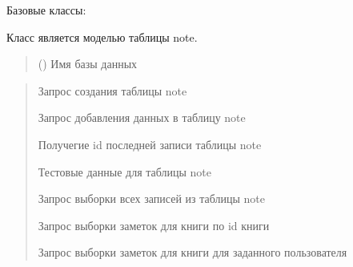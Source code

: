 \documentclass[letterpaper,10pt,russian]{sphinxmanual}
\begin{document}
\begin{fulllineitems}
\label{\detokenize{database.sqlite3_interface.tables:database.sqlite3_interface.tables.note.Note}}
\pysigstartsignatures
{}
\pysigstopsignatures
\sphinxAtStartPar
Базовые классы: {\hyperref[\detokenize{database.sqlite3_interface.tables:database.sqlite3_interface.tables.table.Table}]{}}

\sphinxAtStartPar
Класс является моделью таблицы note.
\begin{quote}\begin{description}
\sphinxAtStartPar
{} () \textendash{} Имя базы данных

\end{description}\end{quote}
\begin{description}
\begin{quote}\begin{description}
\sphinxAtStartPar
Запрос создания таблицы note

\sphinxAtStartPar
Запрос добавления данных в таблицу note

\sphinxAtStartPar
Получегие id последней записи таблицы note

\sphinxAtStartPar
Тестовые данные для таблицы note

\sphinxAtStartPar
Запрос выборки всех записей из таблицы note

\sphinxAtStartPar
Запрос выборки заметок для книги по id книги

\sphinxAtStartPar
Запрос выборки заметок для книги для заданного пользователя

\end{description}\end{quote}


\end{description}
\end{fulllineitems}
\end{document}
